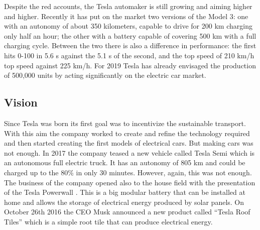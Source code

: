 Despite the red accounts, the Tesla automaker is still growing and aiming higher and higher. Recently it has put on the market two versions of the Model 3: one with an autonomy of about 350 kilometers, capable to drive for 200 km charging only half an hour; the other with a battery capable of covering 500 km with a full charging cycle. Between the two there is also a difference in performance: the first hits 0-100 in 5.6 s against the 5.1 s of the second, and the top speed of 210 km/h top speed against 225 km/h. For 2019 Tesla has already envisaged the production of 500,000 units by acting significantly on the electric car market.



\subsection{Vision}
Since Tesla was born its first goal was to incentivize the sustainable transport. With this aim the company worked to create and refine the technology required and then started creating the first models of electrical cars. But making cars was not enough. In 2017 the company teased a new vehicle called Tesla Semi which is an autonomous full electric truck. It has an autonomy of 805 km and could be charged up to the 80\% in only 30 minutes.
However, again, this was not enough. The business of the company opened also to the house field with the presentation of the Tesla Powerwall \cite{Powerwall}. This is a big modular battery that can be installed at home and allows the storage of electrical energy produced by solar panels. On October 26th 2016 the CEO Musk announced a new product called “Tesla Roof Tiles” which is a simple root tile that can produce electrical energy.



